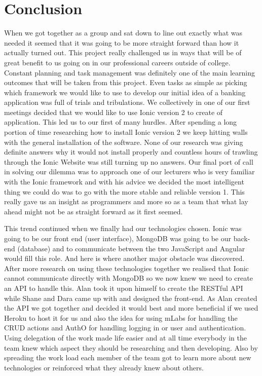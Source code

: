 \chapter{Conclusion}
When we got together as a group and sat down to line out exactly what was needed it seemed that it was going to be more straight forward than how it actually turned out. This project really challenged us in ways that will be of great benefit to us going on in our professional careers outside of college. Constant planning and task management was definitely one of the main learning outcomes that will be taken from this project. Even tasks as simple as picking which framework we would like to use to develop our initial idea of a banking application was full of trials and tribulations. We collectively in one of our first meetings decided that we would like to use Ionic version 2 to create of application. This led us to our first of many hurdles. After spending a long portion of time researching how to install Ionic version 2 we keep hitting walls with the general installation of the software. None of our research was giving definite answers why it would not install properly and countless hours of trawling through the Ionic Website was still turning up no answers. Our final port of call in solving our dilemma was to approach one of our lecturers who is very familiar with the Ionic framework and with his advice we decided the most intelligent thing we could do was to go with the more stable and reliable version 1. This really gave us an insight as programmers and more so as a team that what lay ahead might not be as straight forward as it first seemed.

This trend continued when we finally had our technologies chosen. Ionic was going to be our front end (user interface), MongoDB was going to be our back-end (database) and to communicate between the two JavaScript and Angular would fill this role. And here is where another major obstacle was discovered. After more research on using these technologies together we realised that Ionic cannot communicate directly with MongoDB so we now knew we need to create an API to handle this.  Alan took it upon himself to create the RESTful API while Shane and Dara came up with and designed the front-end. As Alan created the API we got together and decided it would best and more beneficial if we used Heroku to host it for us and also the idea for using mLabs for handling the CRUD actions and AuthO for handling logging in or user and authentication. Using delegation of the work made life easier and at all time everybody in the team knew which aspect they should be researching and then developing. Also by spreading the work load each member of the team got to learn more about new technologies or reinforced what they already knew about others.

